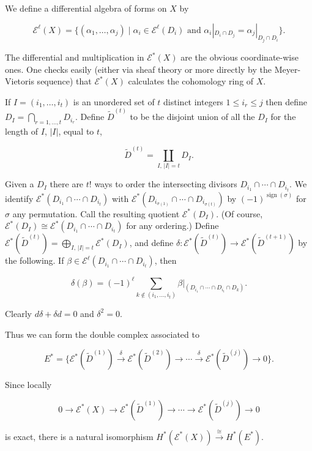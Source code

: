 \documentclass[
  english,
  a3paper,
  a3paper]{extarticle}
\begin{document}
We define a differential algebra of forms on \(X\) by

\[\mathcal E^{\ell}(X)=\{(\alpha_1,\ldots,\alpha_j)\mid \alpha_i\in\mathcal E^{\ell}(D_i)\text{ and }\alpha_i|_{D_i\cap D_j}=\alpha_j|_{D_j\cap D_i}\}.\]

The differential and multiplication in \(\mathcal E^*(X)\) are the
obvious coordinate-wise ones. One checks easily (either via sheaf theory
or more directly by the Meyer-Vietoris sequence) that
\(\mathcal E^*(X)\) calculates the cohomology ring of \(X\).

If \(I=(i_1,\ldots,i_t)\) is an unordered set of \(t\) distinct integers
\(1\leq i_r\leq j\) then define \(D_I=\bigcap_{r=1,\ldots,t}D_{i_r}\).
Define \(\widetilde D^{(t)}\) to be the disjoint union of all the
\(D_I\) for the length of \(I\), \(|I|\), equal to \(t\),

\[\widetilde D^{(t)}=\coprod_{I,\,|I|=t}D_I.\]

Given a \(D_I\) there are \(t!\) ways to order the intersecting divisors
\(D_{i_1}\cap\cdots\cap D_{i_t}\). We identify
\(\mathcal E^*(D_{i_1}\cap\cdots\cap D_{i_t})\) with
\(\mathcal E^*(D_{i_{\sigma(1)}}\cap\cdots\cap D_{i_{\sigma(t)}})\) by
\((-1)^{\operatorname{sign}(\sigma)}\) for \(\sigma\) any permutation.
Call the resulting quotient \(\mathcal E^*(D_I)\). (Of course,
\(\mathcal E^*(D_I)\cong\mathcal E^*(D_{i_1}\cap\cdots\cap D_{i_t})\)
for any ordering.) Define
\(\mathcal E^*(\widetilde D^{(t)})=\bigoplus_{I,\,|I|=t}\mathcal E^*(D_I)\),
and define
\(\delta:\mathcal E^*(\widetilde D^{(t)})\to\mathcal E^*(\widetilde D^{(t+1)})\)
by the following. If
\(\beta\in\mathcal E^{\ell}(D_{i_1}\cap\cdots\cap D_{i_t})\), then

\[\delta(\beta)=(-1)^{\ell}\sum_{k\notin(i_1,\ldots,i_t)}\beta|_{(D_{i_1}\cap\cdots\cap D_{i_t}\cap D_k)}.\]

Clearly \(d\delta+\delta d=0\) and \(\delta^2=0\).

Thus we can form the double complex associated to

\[E^*=\{\mathcal E^*(\widetilde D^{(1)})\xrightarrow{\delta}\mathcal E^*(\widetilde D^{(2)})\longrightarrow\cdots\xrightarrow{\delta}\mathcal E^*(\widetilde D^{(j)})\longrightarrow0\}.\]

Since locally

\[0\longrightarrow\mathcal E^*(X)\longrightarrow\mathcal E^*(\widetilde D^{(1)})\longrightarrow\cdots\longrightarrow\mathcal E^*(\widetilde D^{(j)})\longrightarrow0\]

is exact, there is a natural isomorphism
\(H^*(\mathcal E^*(X))\xrightarrow{\cong}H^*(E^*)\).
\end{document}
